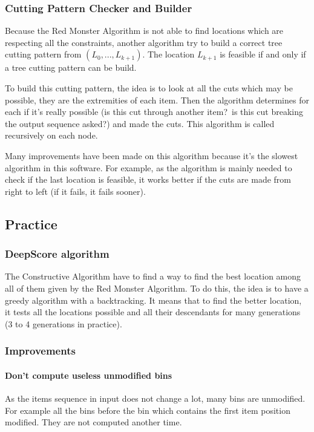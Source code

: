 \documentclass{article}
\begin{document}
        \subsubsection{Cutting Pattern Checker and Builder}
Because the Red Monster Algorithm is not able to find locations which are respecting all the constraints, another algorithm try to build a correct tree cutting pattern from $(L_0, ..., L_{k + 1})$. The location $L_{k + 1}$ is feasible if and only if a tree cutting pattern can be build.

To build this cutting pattern, the idea is to look at all the cuts which may be possible, they are the extremities of each item. Then the algorithm determines for each if it's really possible (is this cut through another item? is this cut breaking the output sequence asked?) and made the cuts. This algorithm is called recursively on each node.

Many improvements have been made on this algorithm because it's the slowest algorithm in this software. For example, as the algorithm is mainly needed to check if the last location is feasible, it works better if the cuts are made from right to left (if it fails, it fails sooner).

    \subsection{Practice}
        \subsubsection{DeepScore algorithm}
The Constructive Algorithm have to find a way to find the best location among all of them given by the Red Monster Algorithm. To do this, the idea is to have a greedy algorithm with a backtracking. It means that to find the better location, it tests all the locations possible and all their descendants for many generations (3 to 4 generations in practice).

\subsubsection{Improvements}
    \paragraph{Don't compute useless unmodified bins}
As the items sequence in input does not change a lot, many bins are unmodified. For example all the bins before the bin which contains the first item position modified. They are not computed another time.
\end{document}
